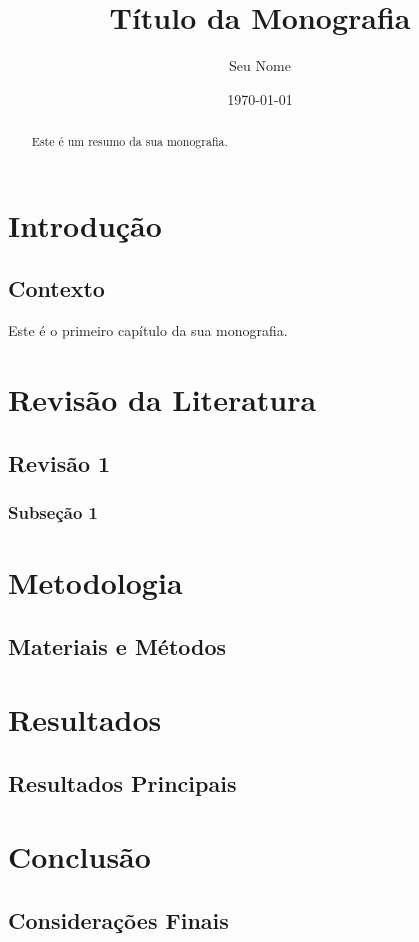 \documentclass[12pt, a4paper]{report}
\title{Título da Monografia}
\author{Seu Nome}
\date{\today}
\begin{document}
\maketitle

\begin{abstract}
    Este é um resumo da sua monografia.
\end{abstract}

\tableofcontents

\chapter{Introdução}
\section{Contexto}
Este é o primeiro capítulo da sua monografia.

\chapter{Revisão da Literatura}
\section{Revisão 1}
\subsection{Subseção 1}

\chapter{Metodologia}
\section{Materiais e Métodos}

\chapter{Resultados}
\section{Resultados Principais}

\chapter{Conclusão}
\section{Considerações Finais}



\end{document}

